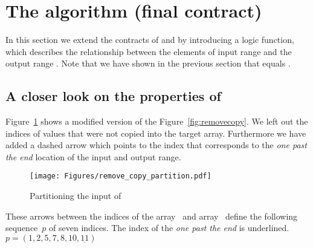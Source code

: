 
\section{The \removecopyiii algorithm (final contract)}
\label{sec:removecopyiii}

In this section we extend the contracts of 
and  by introducing a 
logic function, which describes the relationship between the elements of
input range  and the output range .
Note that we have shown in the previous section that
\inl{\\result} equals .

\subsection{A closer look on the properties of \removecopy}
\label{sec:formal-view-remove}

Figure~\ref{fig:removecopy-trip} shows a modified version of the
Figure~\ref{fig:removecopy}. We left out the indices of values that were not copied into the
target array. Furthermore we have added a dashed arrow which points to the
index that corresponds to the \emph{one past the end} location of the input and
output range.

\begin{figure}[hbt]
\begin{center}
\texttt{[image: Figures/remove\_copy\_partition.pdf]}
\end{center}
\caption{\label{fig:removecopy-trip} Partitioning the input of \removecopy}
\end{figure}
\FloatBarrier

These arrows between the indices of the array~ and array~ define
the following sequence~$p$ of seven indices. The index of the \emph{one past the end} is underlined. 
$p = (1, 2, 5, 7, 8, 10, \underline{11})$



